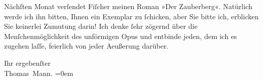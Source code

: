 \pstart
           Nächſten Monat verſendet Fiſcher meinen Roman
                  »Der Zauberberg«. Natürlich werde ich ihn
               bitten, Ihnen ein Exemplar zu ſchicken, aber Sie bitte ich, erblicken Sie keinerlei
               Zumutung darin! Ich denke ſehr zögernd über die Menſchenmöglichkeit des unförmigen
                  Opus und entbinde jeden,
               dem ich es zugehen laſſe, feierlich von jeder Aeußerung darüber.\pend
           
\pstart
           Ihr ergebenſter{\\[\baselineskip]}\spacefill\mbox{Thomas Mann.}\pend
           \leftskip=0em{}\endnumbering{}  
      